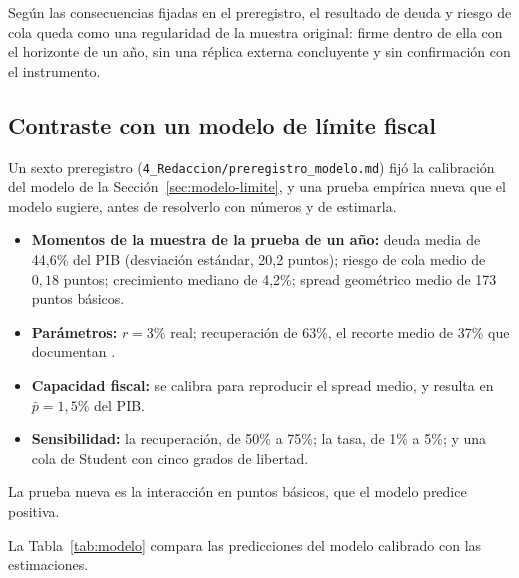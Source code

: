 Según las consecuencias fijadas en el preregistro, el resultado de deuda y riesgo de cola queda como una regularidad de la muestra original: firme dentro de ella con el horizonte de un año, sin una réplica externa concluyente y sin confirmación con el instrumento.

\subsection{Contraste con un modelo de límite fiscal}
\label{sec:modelo-resultados}

Un sexto preregistro (\texttt{4\_Redaccion/preregistro\_modelo.md}) fijó la calibración del modelo de la Sección~\ref{sec:modelo-limite}, y una prueba empírica nueva que el modelo sugiere, antes de resolverlo con números y de estimarla.
\begin{itemize}
    \item \textbf{Momentos de la muestra de la prueba de un año:} deuda media de 44,6\% del PIB (desviación estándar, 20,2 puntos); riesgo de cola medio de $0{,}18$ puntos; crecimiento mediano de 4,2\%; spread geométrico medio de 173 puntos básicos.
    \item \textbf{Parámetros:} $r=3\%$ real; recuperación de 63\%, el recorte medio de 37\% que documentan \citet{CrucesTrebesch2013}.
    \item \textbf{Capacidad fiscal:} se calibra para reproducir el spread medio, y resulta en $\bar p=1{,}5\%$ del PIB.
    \item \textbf{Sensibilidad:} la recuperación, de 50\% a 75\%; la tasa, de 1\% a 5\%; y una cola de Student con cinco grados de libertad.
\end{itemize}
La prueba nueva es la interacción en puntos básicos, que el modelo predice positiva.

La Tabla~\ref{tab:modelo} compara las predicciones del modelo calibrado con las estimaciones.


